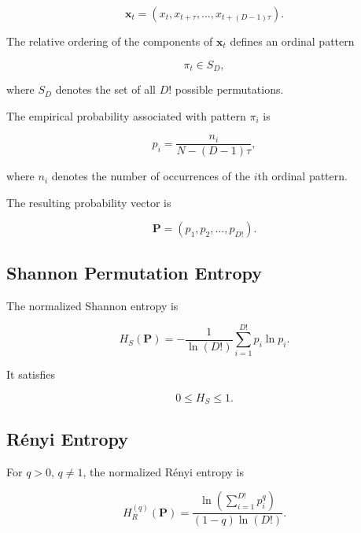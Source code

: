 \documentclass[journal]{IEEEtran}
\begin{document}
	\begin{equation}
		\mathbf{x}_t =
		(x_t,x_{t+\tau},\ldots,x_{t+(D-1)\tau}).
	\end{equation}
	
	The relative ordering of the components of $\mathbf{x}_t$
	defines an ordinal pattern
	
	\begin{equation}
		\pi_t \in S_D,
	\end{equation}
	
	where $S_D$ denotes the set of all $D!$ possible permutations.
	
	The empirical probability associated with pattern $\pi_i$ is
	
	\begin{equation}
		p_i =
		\frac{n_i}
		{N-(D-1)\tau},
	\end{equation}
	
	where $n_i$ denotes the number of occurrences of the $i$th
	ordinal pattern.
	
	The resulting probability vector is
	
	\begin{equation}
		\mathbf{P} =
		(p_1,p_2,\ldots,p_{D!}).
	\end{equation}
	
	
	\subsection{Shannon Permutation Entropy}
	
	The normalized Shannon entropy is
	
	\begin{equation}
		H_S(\mathbf{P})
		=
		-\frac{1}{\ln(D!)}
		\sum_{i=1}^{D!}
		p_i \ln p_i.
		\label{eq:shannon}
	\end{equation}
	
	It satisfies
	
	\begin{equation}
		0 \le H_S \le 1.
	\end{equation}
	
	
	\subsection{R\'enyi Entropy}
	
	For $q>0$, $q\neq1$, the normalized R\'enyi entropy is
	
	\begin{equation}
		H_R^{(q)}(\mathbf{P})
		=
		\frac{
			\ln\left(
			\sum_{i=1}^{D!}p_i^q
			\right)
		}{
			(1-q)\ln(D!)
		}.
	\end{equation}
	
\end{document}
